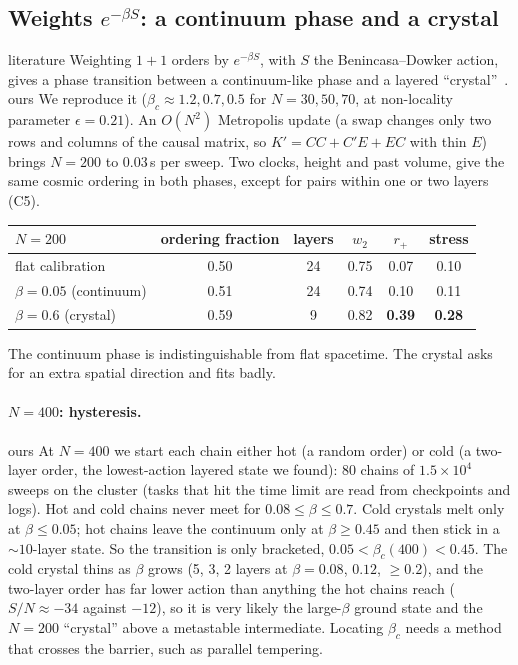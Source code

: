 \documentclass[11pt,a4paper]{article}
\newcommand{\tagbox}[2]{\textsf{\scriptsize\colorbox{#1!12}{\textcolor{#1!70!black}{#2}}}}
\newcommand{\lit}{\tagbox{blue}{literature}}
\newcommand{\ours}{\tagbox{orange}{ours}}
\begin{document}
\subsection{Weights $e^{-\beta S}$: a continuum phase and a crystal}
\lit{} Weighting $1+1$ orders by $e^{-\beta S}$, with $S$ the Benincasa--Dowker action, gives a phase transition between a continuum-like phase and a layered ``crystal''~\cite{Surya12,BHS08,GOS18}. \ours{} We reproduce it ($\beta_c\approx1.2,0.7,0.5$ for $N=30,50,70$, at non-locality parameter $\epsilon=0.21$). An $O(N^2)$ Metropolis update (a swap changes only two rows and columns of the causal matrix, so $K'=CC+C'E+EC$ with thin $E$) brings $N=200$ to $0.03$\,s per sweep. Two clocks, height and past volume, give the same cosmic ordering in both phases, except for pairs within one or two layers (C5).
\begin{center}\small
\begin{tabular}{@{}lccccc@{}}
\toprule
$N=200$ & ordering fraction & layers & $w_2$ & $r_+$ & stress\\
\midrule
flat calibration & 0.50 & 24 & 0.75 & 0.07 & 0.10\\
$\beta=0.05$ (continuum) & 0.51 & 24 & 0.74 & 0.10 & 0.11\\
$\beta=0.6$ (crystal) & 0.59 & 9 & 0.82 & \textbf{0.39} & \textbf{0.28}\\
\bottomrule
\end{tabular}
\end{center}
The continuum phase is indistinguishable from flat spacetime. The crystal asks for an extra spatial direction and fits badly.

\paragraph{$N=400$: hysteresis.} \ours{} At $N=400$ we start each chain either hot (a random order) or cold (a two-layer order, the lowest-action layered state we found): 80 chains of $1.5\times10^4$ sweeps on the cluster (tasks that hit the time limit are read from checkpoints and logs). Hot and cold chains never meet for $0.08\le\beta\le0.7$. Cold crystals melt only at $\beta\le0.05$; hot chains leave the continuum only at $\beta\ge0.45$ and then stick in a $\sim10$-layer state. So the transition is only bracketed, $0.05<\beta_c(400)<0.45$. The cold crystal thins as $\beta$ grows (5, 3, 2 layers at $\beta=0.08$, $0.12$, $\ge0.2$), and the two-layer order has far lower action than anything the hot chains reach ($S/N\approx-34$ against $-12$), so it is very likely the large-$\beta$ ground state and the $N=200$ ``crystal'' above a metastable intermediate. Locating $\beta_c$ needs a method that crosses the barrier, such as parallel tempering.
\end{document}
